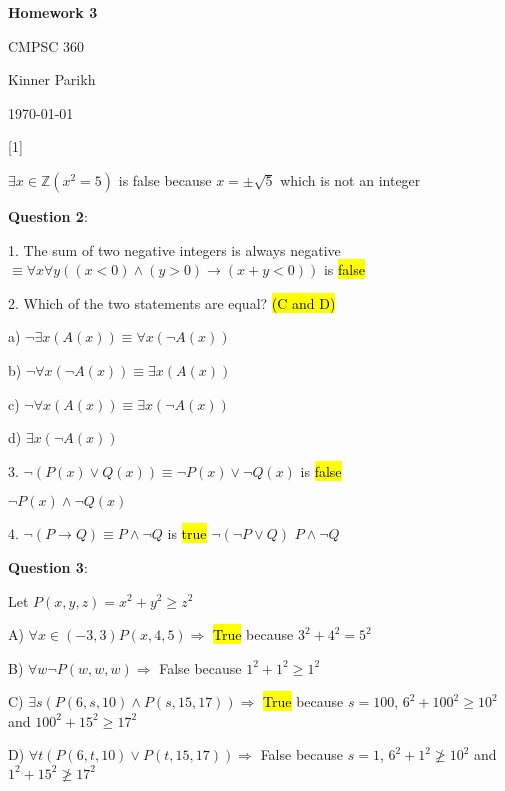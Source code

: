 \documentclass{article} %
\newcommand{\question}[2][]{\begin{flushleft}
        \textbf{Question #1}: \textit{#2}

\end{flushleft}}
\newcommand{\maketitletwo}[2][]{\begin{center}
        \Large{\textbf{Homework #1}
            
            CMPSC 360} %
        \vspace{5pt}
        
        \normalsize{Kinner Parikh  %
        
        \today}        %
        \vspace{15pt}
        
\end{center}}
\begin{document}
    \maketitletwo[3]  %
    
    \question[1]{}

    $\exists x \in \mathbb{Z}(x ^ 2 = 5)$ is false because $x = \pm \sqrt{5}$ which is not an integer

    \question[2]{}

    1. The sum of two negative integers is always negative $\equiv \forall x \forall y((x < 0) \land (y > 0) \rightarrow (x + y < 0 ))$ \tabto{0.98cm} is \hl{false}

    \hspace{0cm}

    2. Which of the two statements are equal? \hl{(C and D)}

    \tabto{0.98cm}a) $\neg \exists x(A(x)) \equiv \forall x(\neg A(x))$

    \tabto{0.98cm}b) $\neg \forall x(\neg A(x)) \equiv \exists x(A(x))$

    \tabto{0.98cm}c) $\neg \forall x(A(x)) \equiv \exists x(\neg A(x))$

    \tabto{0.98cm}d) $\exists x(\neg A(x))$

    \hspace{0cm}

    3. $\neg (P(x) \lor Q(x)) \equiv \neg P(x) \lor \neg Q(x)$ is \hl{false}

    \tabto{0.98cm} $\neg P(x) \land \neg Q(x)$

    \hspace{0cm}

    4. $\neg (P \rightarrow Q) \equiv P \land \neg Q$ is \hl{true}
    \tabto{0.98cm} $\neg (\neg P \lor Q)$
    \tabto{0.98cm} $P \land \neg Q$

    \question[3]{}

    Let $P(x, y, z) = x^2 + y^2 \ge z^2$

    A) $\forall x \in (-3, 3) P(x, 4, 5) \Rightarrow$ \hl{True} because $3^2 + 4^2 = 5^2$

    B) $\forall w \neg P(w, w, w) \Rightarrow$ False because $1^2 + 1^2 \geq 1^2$

    C) $\exists s (P(6, s, 10) \land P(s, 15, 17)) \Rightarrow$ \hl{True} because $s = 100$, $6^2 + 100^2 \ge 10^2$ and $100^2 + 15^2 \ge 17^2$

    D) $\forall t (P(6, t, 10) \lor P(t, 15, 17)) \Rightarrow$ False because $s = 1$, $6^2 + 1^2 \ngeq 10^2$ and $1^2 + 15^2 \ngeq 17^2$
\end{document}
